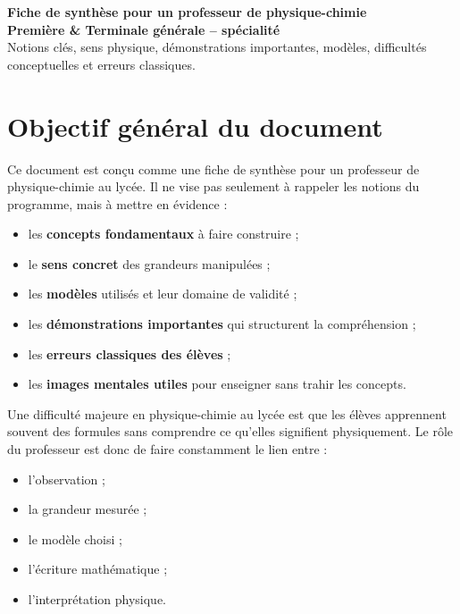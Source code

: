 \documentclass[11pt,a4paper]{article}
\begin{document}
\begin{center}
    {\LARGE \textbf{Fiche de synthèse pour un professeur de physique-chimie}}\\[0.4em]
    {\large \textbf{Première \& Terminale générale -- spécialité}}\\[0.4em]
    Notions clés, sens physique, démonstrations importantes, modèles, difficultés conceptuelles et erreurs classiques.
\end{center}

\vspace{0.8em}

\tableofcontents

\newpage

\section{Objectif général du document}

Ce document est conçu comme une fiche de synthèse pour un professeur de physique-chimie au lycée.
Il ne vise pas seulement à rappeler les notions du programme, mais à mettre en évidence :
\begin{itemize}[label=--]
    \item les \textbf{concepts fondamentaux} à faire construire ;
    \item le \textbf{sens concret} des grandeurs manipulées ;
    \item les \textbf{modèles} utilisés et leur domaine de validité ;
    \item les \textbf{démonstrations importantes} qui structurent la compréhension ;
    \item les \textbf{erreurs classiques des élèves} ;
    \item les \textbf{images mentales utiles} pour enseigner sans trahir les concepts.
\end{itemize}

\begin{bilan}
Une difficulté majeure en physique-chimie au lycée est que les élèves apprennent souvent des formules
sans comprendre ce qu'elles signifient physiquement.
Le rôle du professeur est donc de faire constamment le lien entre :
\begin{itemize}
    \item l'observation ;
    \item la grandeur mesurée ;
    \item le modèle choisi ;
    \item l'écriture mathématique ;
    \item l'interprétation physique.
\end{itemize}
\end{bilan}
\end{document}
